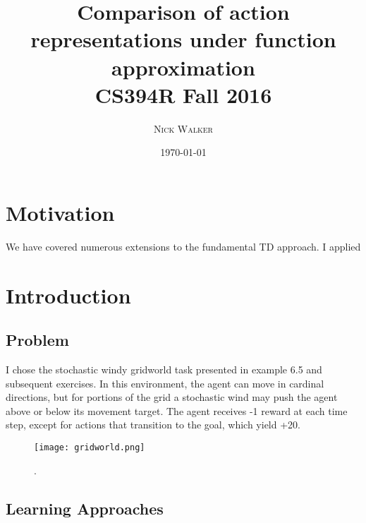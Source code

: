 \documentclass{article}
\title{Comparison of action representations under function approximation \\ \large CS394R Fall 2016} %
\author{\textsc{Nick Walker}} %
\date{\today} %
\begin{document}
	\maketitle %



	\section{Motivation}
	
	We have covered numerous extensions to the fundamental TD approach. I applied 




	\section{Introduction}

	\subsection{Problem}
	
	I chose the stochastic windy gridworld task presented in example 6.5 and subsequent exercises. In this environment, the agent can move in cardinal directions, but for portions of the grid a stochastic wind may push the agent above or below its movement target. The agent receives -1 reward at each time step, except for actions that transition to the goal, which yield +20.
	
			\begin{figure}[h]
				\begin{center}
					\texttt{[image: gridworld.png]}
					\caption{.}
				\end{center}
			\end{figure}


	\subsection{Learning Approaches}



\end{document}
